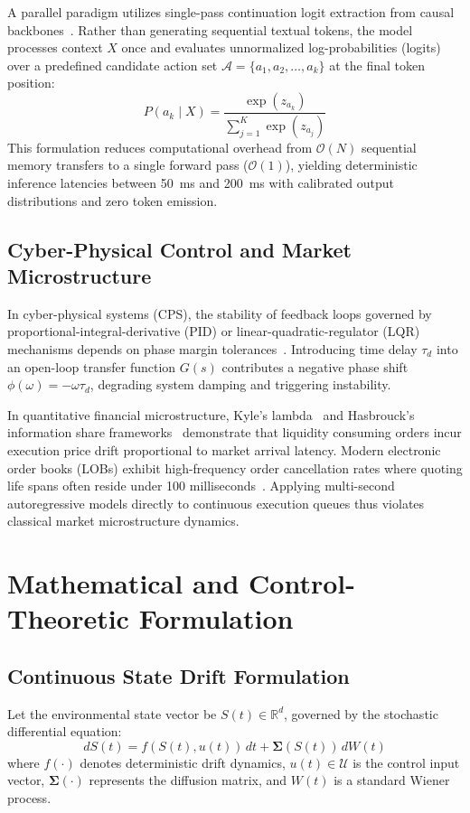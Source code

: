 \documentclass[journal,compsoc]{IEEEtran}
\begin{document}
A parallel paradigm utilizes single-pass continuation logit extraction from causal backbones~\cite{typesafe2025systemone}. Rather than generating sequential textual tokens, the model processes context $X$ once and evaluates unnormalized log-probabilities (logits) over a predefined candidate action set $\mathcal{A} = \{a_1, a_2, \dots, a_k\}$ at the final token position:
\begin{equation}
P(a_k \mid X) = \frac{\exp(z_{a_k})}{\sum_{j=1}^{K} \exp(z_{a_j})}
\end{equation}
This formulation reduces computational overhead from $\mathcal{O}(N)$ sequential memory transfers to a single forward pass ($\mathcal{O}(1)$), yielding deterministic inference latencies between 50~ms and 200~ms with calibrated output distributions and zero token emission.

\subsection{Cyber-Physical Control and Market Microstructure}
In cyber-physical systems (CPS), the stability of feedback loops governed by proportional-integral-derivative (PID) or linear-quadratic-regulator (LQR) mechanisms depends on phase margin tolerances~\cite{astrom2021feedback}. Introducing time delay $\tau_d$ into an open-loop transfer function $G(s)$ contributes a negative phase shift $\phi(\omega) = -\omega \tau_d$, degrading system damping and triggering instability.

In quantitative financial microstructure, Kyle's lambda~\cite{kyle1985continuous} and Hasbrouck's information share frameworks~\cite{hasbrouck2007empirical} demonstrate that liquidity consuming orders incur execution price drift proportional to market arrival latency. Modern electronic order books (LOBs) exhibit high-frequency order cancellation rates where quoting life spans often reside under 100 milliseconds~\cite{ohara2015highfrequency}. Applying multi-second autoregressive models directly to continuous execution queues thus violates classical market microstructure dynamics.

\section{Mathematical and Control-Theoretic Formulation}

\subsection{Continuous State Drift Formulation}
Let the environmental state vector be $S(t) \in \mathbb{R}^d$, governed by the stochastic differential equation:
\begin{equation}
dS(t) = f(S(t), u(t)) \, dt + \mathbf{\Sigma}(S(t)) \, dW(t)
\end{equation}
where $f(\cdot)$ denotes deterministic drift dynamics, $u(t) \in \mathcal{U}$ is the control input vector, $\mathbf{\Sigma}(\cdot)$ represents the diffusion matrix, and $W(t)$ is a standard Wiener process.
\end{document}
